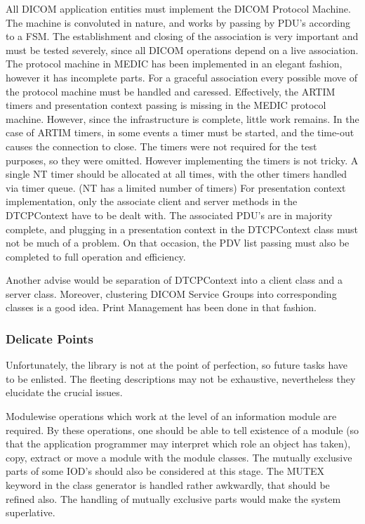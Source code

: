 \documentclass[a4paper,10pt]{article}
\begin{document}
All DICOM application entities must implement the DICOM Protocol Machine.
The machine is convoluted in nature, and works by passing by PDU{'}s
according to a FSM. The establishment and closing of the association is very
important and must be tested severely, since all DICOM operations depend on
a live association. The protocol machine in MEDIC has been implemented in an
elegant fashion, however it has incomplete parts. For a graceful association
every possible move of the protocol machine must be handled and caressed.
Effectively, the ARTIM timers and presentation context passing is missing in
the MEDIC protocol machine. However, since the infrastructure is complete,
little work remains. In the case of ARTIM timers, in some events a timer
must be started, and the time-out causes the connection to close. The timers
were not required for the test purposes, so they were omitted. However
implementing the timers is not tricky. A single NT timer should be allocated
at all times, with the other timers handled via timer queue. (NT has a
limited number of timers) For presentation context implementation, only the
associate client and server methods in the DTCPContext have to be dealt
with. The associated PDU{'}s are in majority complete, and plugging in a
presentation context in the DTCPContext class must not be much of a problem.
On that occasion, the PDV list passing must also be completed to full
operation and efficiency.

Another advise would be separation of DTCPContext into a client class and a
server class. Moreover, clustering DICOM Service Groups into corresponding
classes is a good idea. Print Management has been done in that fashion.

\subsubsection{Delicate Points}

Unfortunately, the library is not at the point of perfection, so future
tasks have to be enlisted. The fleeting descriptions may not be exhaustive,
nevertheless they elucidate the crucial issues.

Modulewise operations which work at the level of an information module are
required. By these operations, one should be able to tell existence of a
module (so that the application programmer may interpret which role an
object has taken), copy, extract or move a module with the module classes.
The mutually exclusive parts of some IOD{'}s should also be considered at
this stage. The MUTEX keyword in the class generator is handled rather
awkwardly, that should be refined also. The handling of mutually exclusive
parts would make the system superlative.
\end{document}
